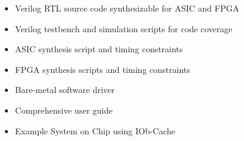 %

\begin{itemize}                                            
  \itemsep-0.5em
\item Verilog RTL source code synthesizable for ASIC and FPGA
\item Verilog testbench and simulation scripts for code coverage
\item ASIC synthesis script and timing constraints
\item FPGA synthesis scripts and timing constraints
\item Bare-metal software driver
\item Comprehensive user guide
\item Example System on Chip using IOb-Cache
\end{itemize}   
